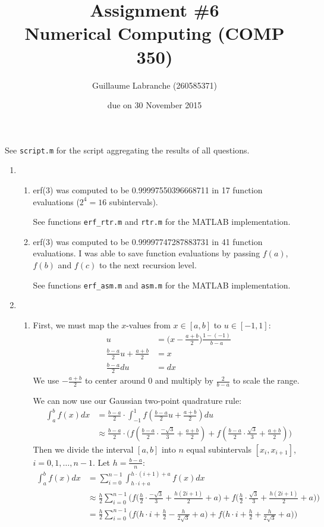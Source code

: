 \documentclass{article}
\author{Guillaume Labranche (260585371)}
\title{Assignment \#6\\Numerical Computing (COMP 350)}
\date{due on 30 November 2015}
\begin{document}
\maketitle

See \texttt{script.m} for the script aggregating the results of all questions.
\begin{enumerate}
\item \begin{enumerate}
\item erf(3) was computed to be  0.99997550396668711 in 17 function evaluations ($2^4=16$ subintervals).

See functions \texttt{erf\_rtr.m} and \texttt{rtr.m} for the MATLAB implementation.

\item erf(3) was computed to be 0.99997747287883731 in 41 function evaluations. I was able to save function evaluations by passing $f(a)$, $f(b)$ and $f(c)$ to the next recursion level.

See functions \texttt{erf\_asm.m} and \texttt{asm.m} for the MATLAB implementation.
\end{enumerate}

\item \begin{enumerate}

\item First, we must map the $x$-values from $x \in [a,b]$ to $u \in [-1,1]$: \begin{align*}
u &= \Big(x-\frac{a+b}{2}\Big)\frac{1-(-1)}{b-a} \\
\frac{b-a}{2}u + \frac{a+b}{2} &= x \\
\frac{b-a}{2}du &= dx
\end{align*}
We use $-\frac{a+b}{2}$ to center around 0 and multiply by $\frac{2}{b-a}$ to scale the range.

We can now use our Gaussian two-point quadrature rule: \begin{align*}
\int_a^b f(x)dx &= \frac{b-a}{2} \cdot \int_{-1}^1 f(\tfrac{b-a}{2}u + \tfrac{a+b}{2})du
\\ &\approx
\frac{b-a}{2} \cdot \Big( 
f(\tfrac{b-a}{2}\cdot \tfrac{-\sqrt{3}}{3} + \tfrac{a+b}{2}) + 
f(\tfrac{b-a}{2}\cdot \tfrac{\sqrt{3}}{3} + \tfrac{a+b}{2}) \Big)
\end{align*}
Then we divide the interval $[a,b]$ into $n$ equal subintervals $[x_i,x_{i+1}]$, $i = 0,1,\ldots,n-1$. Let $h=\frac{b-a}{n}$:
\begin{align*}
\int_a^b f(x)dx &= \sum_{i=0}^{n-1} \int_{h \cdot i + a}^{h \cdot (i+1) + a} f(x)dx
\\ &\approx
\frac{h}{2} \sum_{i=0}^{n-1} \Big(
f\big(\tfrac{h}{2} \cdot \tfrac{-\sqrt{3}}{3} + \tfrac{h(2i+1)}{2} + a\big) +
f\big(\tfrac{h}{2} \cdot \tfrac{\sqrt{3}}{3} + \tfrac{h(2i+1)}{2} + a\big) 
\Big)
\\ &=
\frac{h}{2} \sum_{i=0}^{n-1} \Big(
f\big(h \cdot i + \tfrac{h}{2} - \tfrac{h}{2\sqrt{3}} + a\big) +
f\big(h \cdot i + \tfrac{h}{2} + \tfrac{h}{2\sqrt{3}} + a\big)
\Big)
\end{align*}


\end{enumerate}
\end{enumerate}
\end{document}
